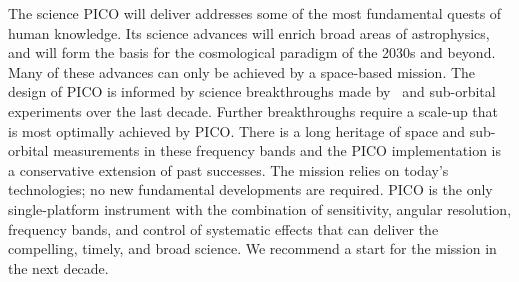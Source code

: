 \documentclass[PICOReport.tex]{subfiles}
\begin{document}
The science PICO will deliver addresses some of the most fundamental quests of human knowledge. Its science advances will enrich broad areas of astrophysics, and will form the basis for the cosmological paradigm of the 2030s and beyond.  Many of these advances can only be achieved by a space-based mission. The design of PICO is informed by science breakthroughs made by \planck\ and sub-orbital experiments over the last decade. Further breakthroughs require a scale-up that is most optimally achieved by PICO.  There is a long heritage of space and sub-orbital measurements in these frequency bands and the PICO implementation is a conservative extension of past successes. The mission relies on today's technologies; no new fundamental developments are required. PICO is the only single-platform instrument with the combination of sensitivity, angular resolution, frequency bands, and control of systematic effects that can deliver the compelling, timely, and broad science. We recommend a start for the mission in the next decade. 







\end{document}
